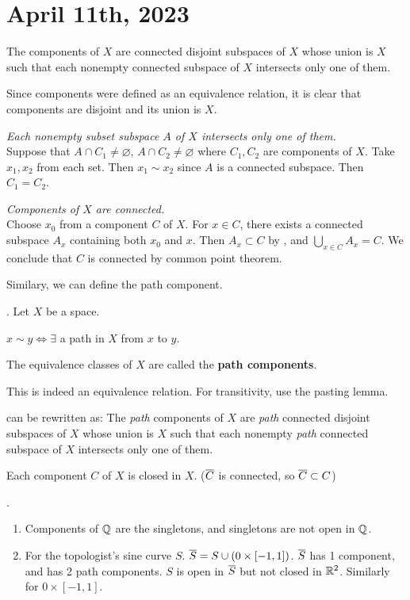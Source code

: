 \section*{April 11th, 2023}

 The components of \(X\) are connected disjoint subspaces of \(X\) whose union is \(X\) such that each nonempty connected subspace of \(X\) intersects only one of them.

\pf Since components were defined as an equivalence relation, it is clear that components are disjoint and its union is \(X\).

 \textit{Each nonempty subset subspace \(A\) of \(X\) intersects only one of them.} \\
Suppose that \(A \cap C_1 \neq \varnothing\), \(A \cap C_2 \neq \varnothing\) where \(C_1, C_2\) are components of \(X\). Take \(x_1, x_2\) from each set. Then \(x_1 \sim x_2\) since \(A\) is a connected subspace. Then \(C_1 = C_2\).

 \textit{Components of \(X\) are connected.} \\
Choose \(x_0\) from a component \(C\) of \(X\). For \(x \in C\), there exists a connected subspace \(A_x\) containing both \(x_0\) and \(x\). Then \(A_x \subset C\) by , and \(\bigcup_{x \in C} A_x = C\). We conclude that \(C\) is connected by common point theorem.

Similary, we can define the path component.

.  Let \(X\) be a space.
\begin{center}
    \(x \sim y \iff \exists\) a path in \(X\) from \(x\) to \(y\).
\end{center}
The equivalence classes of \(X\) are called the \textbf{path components}.

\rmk This is indeed an equivalence relation. For transitivity, use the pasting lemma.

\rmk {} can be rewritten as:
The \textit{path} components of \(X\) are \textit{path} connected disjoint subspaces of \(X\) whose union is \(X\) such that each nonempty \textit{path} connected subspace of \(X\) intersects only one of them.

\rmk Each component \(C\) of \(X\) is closed in \(X\). (\(\overline{C}\) is connected, so \(\overline{C} \subset C\))

\ex.
\begin{enumerate}
    \item Components of \(\mathbb{Q}\) are the singletons, and singletons are not open in \(\mathbb{Q}\).
    \item For the topologist's sine curve \(S\). \(\overline{S} = S \cup \left( 0 \times [-1, 1] \right)\). \(\overline{S}\) has 1 component, and has 2 path components. \(S\) is open in \(\overline{S}\) but not closed in \(\mathbb{R}^2\). Similarly for \(0 \times [-1, 1]\).
\end{enumerate}

